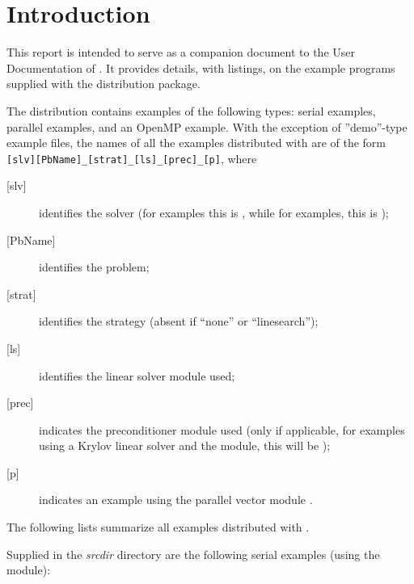 \section{Introduction}\label{s:ex_intro}

This report is intended to serve as a companion document to the User
Documentation of {\kinsol} \cite{kinsol_ug}.  It provides details, with
listings, on the example programs supplied with the {\kinsol} distribution
package.

The {\kinsol} distribution contains examples of the following types: serial
{\CC} examples, parallel {\CC} examples, and an OpenMP example.
With the exception of ''demo''-type example files, the names of all the examples
distributed with {\sundials} are of the form
\verb![slv][PbName]_[strat]_[ls]_[prec]_[p]!, where
\begin{description}
\item [{[slv]}] identifies the solver (for {\kinsol} examples this is ,
  while for {\fkinsol} examples, this is );
\item [{[PbName]}] identifies the problem;
\item [{[strat]}] identifies the strategy (absent if ``none'' or ``linesearch'');
\item [{[ls]}] identifies the linear solver module used;
\item [{[prec]}] indicates the {\kinsol} preconditioner module used
  (only if applicable, for examples using a Krylov linear solver
  and the {\kinbbdpre} module, this will be );
\item [{[p]}] indicates an example using the parallel vector module {\nvecp}.
\end{description}

\vspace{0.2in}\noindent
The following lists summarize all examples distributed with {\kinsol}.

\vspace{0.2in}\noindent
Supplied in the {\em srcdir} directory are the
following serial examples (using the {\nvecs} module):

